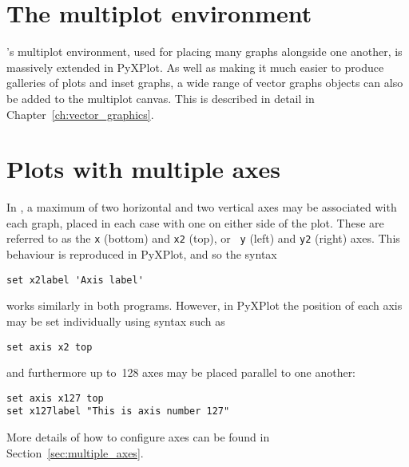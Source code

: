 \vspace{3mm}
\newline
{}
\vspace{3mm}\newline

\vspace{3mm}

\section{The multiplot environment}

\gnuplot's multiplot environment, used for placing many graphs alongside one
another, is massively extended in PyXPlot.  As well as making it much easier to
produce galleries of plots and inset graphs, a wide range of vector graphs
objects can also be added to the multiplot canvas. This is described in detail
in Chapter~\ref{ch:vector_graphics}.

\section{Plots with multiple axes}

In \gnuplot, a maximum of two horizontal and two vertical axes may be
associated with each graph, placed in each case with one on either side of the
plot. These are referred to as the {\tt x} (bottom) and {\tt x2} (top), or {\tt
y} (left) and {\tt y2} (right) axes.  This behaviour is reproduced in PyXPlot,
and so the syntax

\begin{verbatim}
set x2label 'Axis label'
\end{verbatim}

\noindent works similarly in both programs. However, in PyXPlot the position of
each axis may be set individually using syntax such as

\begin{verbatim}
set axis x2 top
\end{verbatim}

\noindent and furthermore up to~128 axes may be placed parallel to one another:

\begin{verbatim}
set axis x127 top
set x127label "This is axis number 127"
\end{verbatim}

\noindent More details of how to configure axes can be found in
Section~\ref{sec:multiple_axes}.

